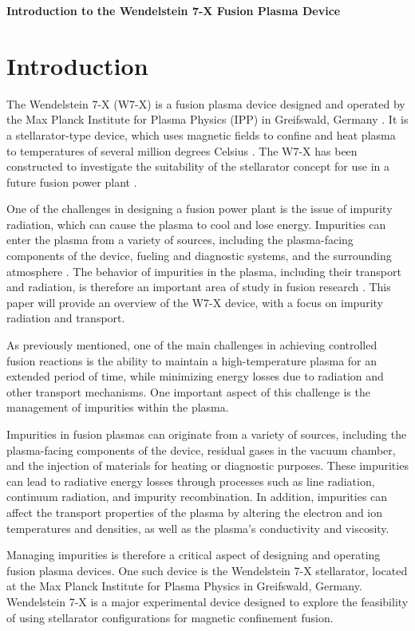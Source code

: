 \documentclass[12pt]{article}
\begin{document}
\begin{center}
\textbf{\Large Introduction to the Wendelstein 7-X Fusion Plasma Device}
\end{center}

\section{Introduction}

The Wendelstein 7-X (W7-X) is a fusion plasma device designed and operated by the Max Planck Institute for Plasma Physics (IPP) in Greifswald, Germany \cite{w7x-website}. It is a stellarator-type device, which uses magnetic fields to confine and heat plasma to temperatures of several million degrees Celsius \cite{stix}. The W7-X has been constructed to investigate the suitability of the stellarator concept for use in a future fusion power plant \cite{w7x-website}.

One of the challenges in designing a fusion power plant is the issue of impurity radiation, which can cause the plasma to cool and lose energy. Impurities can enter the plasma from a variety of sources, including the plasma-facing components of the device, fueling and diagnostic systems, and the surrounding atmosphere \cite{hutchinson}. The behavior of impurities in the plasma, including their transport and radiation, is therefore an important area of study in fusion research \cite{militello}. This paper will provide an overview of the W7-X device, with a focus on impurity radiation and transport.

As previously mentioned, one of the main challenges in achieving controlled fusion reactions is the ability to maintain a high-temperature plasma for an extended period of time, while minimizing energy losses due to radiation and other transport mechanisms. One important aspect of this challenge is the management of impurities within the plasma.

Impurities in fusion plasmas can originate from a variety of sources, including the plasma-facing components of the device, residual gases in the vacuum chamber, and the injection of materials for heating or diagnostic purposes. These impurities can lead to radiative energy losses through processes such as line radiation, continuum radiation, and impurity recombination. In addition, impurities can affect the transport properties of the plasma by altering the electron and ion temperatures and densities, as well as the plasma's conductivity and viscosity.

Managing impurities is therefore a critical aspect of designing and operating fusion plasma devices. One such device is the Wendelstein 7-X stellarator, located at the Max Planck Institute for Plasma Physics in Greifswald, Germany. Wendelstein 7-X is a major experimental device designed to explore the feasibility of using stellarator configurations for magnetic confinement fusion.
\end{document}
